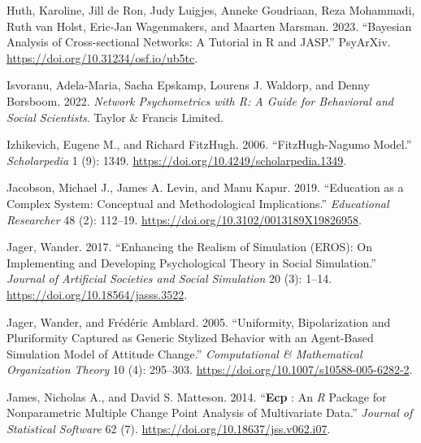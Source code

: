 \documentclass[
  a4paper,
  DIV=11,
  numbers=noendperiod]{scrreprt}
\newlength{\cslhangindent}
\newlength{\cslentryspacingunit} %
\newenvironment{CSLReferences}[2] %
 {%
  \setlength{\parindent}{0pt}
  \ifodd #1
  \let\oldpar\par
  \def\par{\hangindent=\cslhangindent\oldpar}
  \fi
  \setlength{\parskip}{#2\cslentryspacingunit}
 }%
 {}
\begin{document}
\begin{CSLReferences}{1}{0}
\leavevmode{}%
Huth, Karoline, Jill de Ron, Judy Luigjes, Anneke Goudriaan, Reza
Mohammadi, Ruth van Holst, Eric-Jan Wagenmakers, and Maarten Marsman.
2023. {``Bayesian {Analysis} of {Cross-sectional Networks}: {A Tutorial}
in {R} and {JASP}.''} {PsyArXiv}.
\url{https://doi.org/10.31234/osf.io/ub5tc}.

\leavevmode{}%
Isvoranu, Adela-Maria, Sacha Epskamp, Lourens J. Waldorp, and Denny
Borsboom. 2022. \emph{Network {Psychometrics} with {R}: {A Guide} for
{Behavioral} and {Social Scientists}}. {Taylor \& Francis Limited}.

\leavevmode{}%
Izhikevich, Eugene M., and Richard FitzHugh. 2006. {``{FitzHugh-Nagumo}
Model.''} \emph{Scholarpedia} 1 (9): 1349.
\url{https://doi.org/10.4249/scholarpedia.1349}.

\leavevmode{}%
Jacobson, Michael J., James A. Levin, and Manu Kapur. 2019. {``Education
as a {Complex System}: {Conceptual} and {Methodological
Implications}.''} \emph{Educational Researcher} 48 (2): 112--19.
\url{https://doi.org/10.3102/0013189X19826958}.

\leavevmode{}%
Jager, Wander. 2017. {``Enhancing the {Realism} of {Simulation}
({EROS}): {On Implementing} and {Developing Psychological Theory} in
{Social Simulation}.''} \emph{Journal of Artificial Societies and Social
Simulation} 20 (3): 1--14. \url{https://doi.org/10.18564/jasss.3522}.

\leavevmode{}%
Jager, Wander, and Frédéric Amblard. 2005. {``Uniformity,
{Bipolarization} and {Pluriformity Captured} as {Generic Stylized
Behavior} with an {Agent-Based Simulation Model} of {Attitude
Change}.''} \emph{Computational \& Mathematical Organization Theory} 10
(4): 295--303. \url{https://doi.org/10.1007/s10588-005-6282-2}.

\leavevmode{}%
James, Nicholas A., and David S. Matteson. 2014. {``{\textbf{Ecp}} :
{An} {\emph{R}} {Package} for {Nonparametric Multiple Change Point
Analysis} of {Multivariate Data}.''} \emph{Journal of Statistical
Software} 62 (7). \url{https://doi.org/10.18637/jss.v062.i07}.


\end{CSLReferences}
\end{document}
